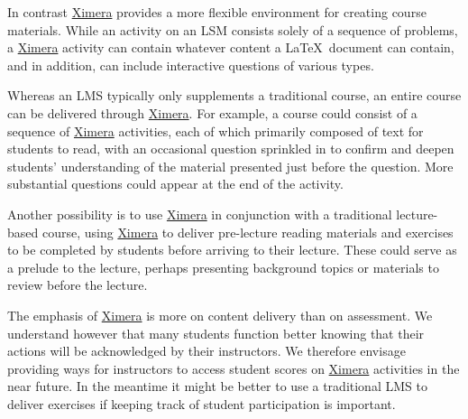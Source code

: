 \documentclass{ximera}
\begin{document}
In contrast \href{http://ximera.osu.edu}{\sf Ximera}
provides a more flexible environment for creating course materials.
While an activity on an LSM consists solely of a sequence
of problems, a \href{http://ximera.osu.edu}{\sf Ximera}
activity can contain whatever content a \LaTeX\ document
can contain, and in addition, can include interactive questions
of various types.

Whereas an LMS typically only supplements a traditional course,
an entire course can be delivered through
\href{http://ximera.osu.edu}{\sf Ximera}.
For example, a course could consist of a sequence
of \href{http://ximera.osu.edu}{\sf Ximera}
activities, each of which primarily composed of text
for students to read, with an occasional 
question sprinkled in to confirm and deepen students'
understanding of the material presented just before the question.
More substantial questions could appear at the end of the activity.

Another possibility is to use \href{http://ximera.osu.edu}{\sf Ximera}
in conjunction with a traditional lecture-based course,
using \href{http://ximera.osu.edu}{\sf Ximera}
to deliver pre-lecture reading materials and exercises
to be completed by students before arriving to their lecture.
These could serve as a prelude to the lecture,
perhaps presenting background topics or materials
to review before the lecture.

The emphasis of \href{http://ximera.osu.edu}{\sf Ximera}
is more on content delivery than on assessment.
We understand however that many students function
better knowing that their actions will be acknowledged by
their instructors. We therefore envisage providing ways
for instructors to access student scores on 
\href{http://ximera.osu.edu}{\sf Ximera} activities
in the near future. In the meantime it might
be better to use a traditional LMS to deliver exercises
if keeping track of student participation is important.
\end{document}
